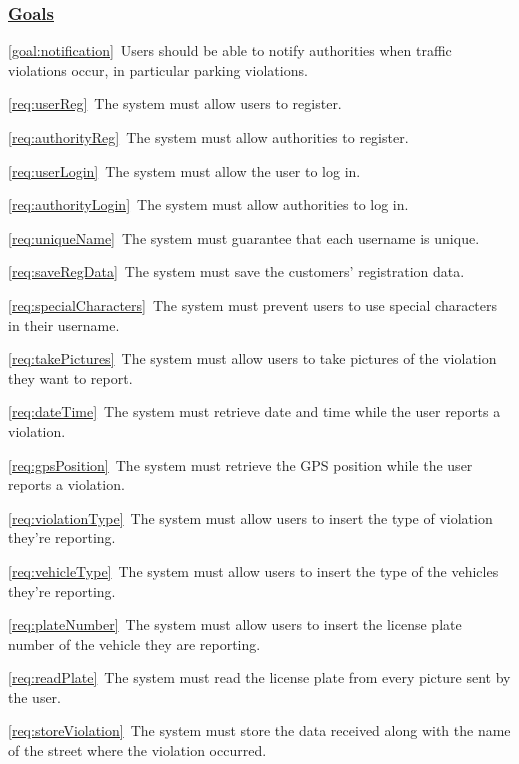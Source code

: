	\subsubsection[Goals]{\hyperlink{toc}{Goals}}
		\label{sec:goalSatisfaction}
		\begin{description}
			\item \ref{goal:notification}\ Users should be able to notify authorities when traffic violations occur, in particular parking violations.
				\begin{description}
					\item \ref{req:userReg}\ The system must allow users to register.
					\item \ref{req:authorityReg}\ The system must allow authorities to register.
					\item \ref{req:userLogin}\ The system must allow the user to log in.
					\item \ref{req:authorityLogin}\ The system must allow authorities to log in.
					\item \ref{req:uniqueName}\ The system must guarantee that each username is unique.
					\item \ref{req:saveRegData}\ The system must save the customers' registration data.
					\item \ref{req:specialCharacters}\ The system must prevent users to use special characters in their username.
					\item \ref{req:takePictures}\ The system must allow users to take pictures of the violation they want to report.
					\item \ref{req:dateTime}\ The system must retrieve date and time while the user reports a violation.
					\item \ref{req:gpsPosition}\ The system must retrieve the GPS position while the user reports a violation.
					\item \ref{req:violationType}\ The system must allow users to insert the type of violation they’re reporting.
					\item \ref{req:vehicleType}\ The system must allow users to insert the type of the vehicles they’re reporting.
					\item \ref{req:plateNumber}\ The system must allow users to insert the license plate number of the vehicle they are reporting.
					\item \ref{req:readPlate}\ The system must read the license plate from every picture sent by the user.
					\item \ref{req:storeViolation}\ The system must store the data received along with the name of the street where the violation occurred.

\end{description}
\end{description}
